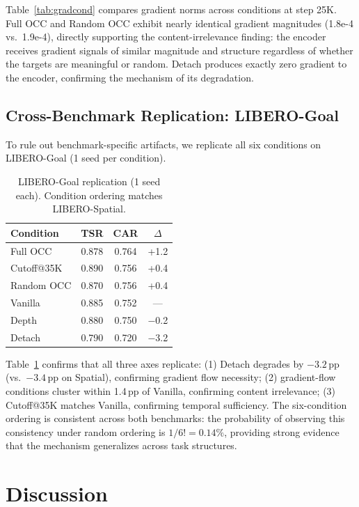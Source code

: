 \documentclass[10pt,twocolumn]{article}
\begin{document}
Table~\ref{tab:gradcond} compares gradient norms across conditions at step 25K.
Full OCC and Random OCC exhibit nearly identical gradient magnitudes (1.8e-4 vs.\ 1.9e-4), directly supporting the content-irrelevance finding: the encoder receives gradient signals of similar magnitude and structure regardless of whether the targets are meaningful or random.
Detach produces exactly zero gradient to the encoder, confirming the mechanism of its degradation.

\subsection{Cross-Benchmark Replication: LIBERO-Goal}
\label{sec:goal}

To rule out benchmark-specific artifacts, we replicate all six conditions on LIBERO-Goal (1 seed per condition).

\begin{table}[t]
\centering
\caption{LIBERO-Goal replication (1 seed each). Condition ordering matches LIBERO-Spatial.}
\label{tab:goal}
\small
\begin{tabular}{@{}lccc@{}}
\toprule
Condition & TSR & CAR & $\Delta$ \\
\midrule
Full OCC   & 0.878 & 0.764 & +1.2 \\
Cutoff@35K & 0.890 & 0.756 & +0.4 \\
Random OCC & 0.870 & 0.756 & +0.4 \\
Vanilla    & 0.885 & 0.752 & --- \\
Depth      & 0.880 & 0.750 & $-$0.2 \\
Detach     & 0.790 & 0.720 & $-$3.2 \\
\bottomrule
\end{tabular}
\end{table}

Table~\ref{tab:goal} confirms that all three axes replicate:
(1) Detach degrades by $-3.2$\,pp (vs.\ $-3.4$\,pp on Spatial), confirming gradient flow necessity;
(2) gradient-flow conditions cluster within 1.4\,pp of Vanilla, confirming content irrelevance;
(3) Cutoff@35K matches Vanilla, confirming temporal sufficiency.
The six-condition ordering is consistent across both benchmarks: the probability of observing this consistency under random ordering is $1/6! = 0.14\%$, providing strong evidence that the mechanism generalizes across task structures.

\section{Discussion}
\label{sec:discussion}
\end{document}
